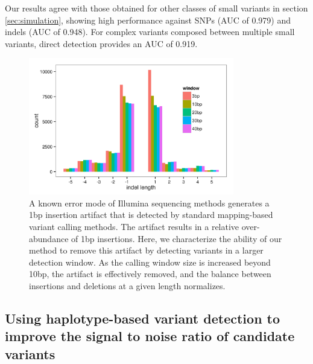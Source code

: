 \documentclass{article}
\begin{document}
Our results agree with those obtained for other classes of small variants in section \ref{sec:simulation}, showing high performance against SNPs (AUC of 0.979) and indels (AUC of 0.948).  For complex variants composed between multiple small variants, direct detection provides an AUC of 0.919.






\begin{figure}[h!]
\centering
\includegraphics[width=0.8\textwidth]{indel_error}
\caption{A known error mode of Illumina sequencing methods generates a 1bp insertion artifact that is detected by standard mapping-based variant calling methods.  The artifact results in a relative over-abundance of 1bp insertions.  Here, we characterize the ability of our method to remove this artifact by detecting variants in a larger detection window.  As the calling window size is increased beyond 10bp, the artifact is effectively removed, and the balance between insertions and deletions at a given length normalizes.}
\label{fig:indelerror}
\end{figure}


\subsection{Using haplotype-based variant detection to improve the signal to noise ratio of candidate variants}
\label{sec:indelerror}
\end{document}
